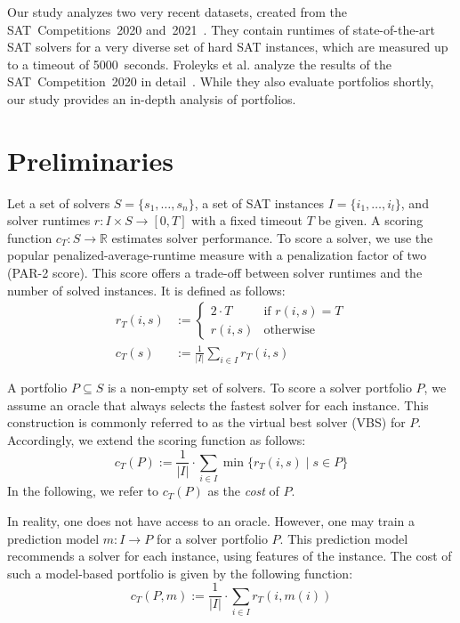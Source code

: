 \documentclass[a4paper,USenglish,pdfa]{lipics-v2021} %
\begin{document}
Our study analyzes two very recent datasets, created from the SAT~Competitions~2020 and~2021~\cite{balyo2020proceedings,balyo2021proceedings}. 
They contain runtimes of state-of-the-art SAT solvers for a very diverse set of hard SAT instances, which are measured up to a timeout of 5000~seconds.
Froleyks et al. analyze the results of the SAT~Competition~2020 in detail~\cite{SC2020:AIJ}.
While they also evaluate portfolios shortly, our study provides an in-depth analysis of portfolios.

\section{Preliminaries}
\label{sec:preliminaries}

Let a set of solvers $S = \{s_1, \dots, s_n\}$, a set of SAT instances $I = \{i_1, \dots, i_l\}$, and solver runtimes $r: I \times S \rightarrow [0, T]$ with a fixed timeout $T$ be given.
A scoring function $c_T: S \rightarrow \mathbb{R}$ estimates solver performance. 
To score a solver, we use the popular penalized-average-runtime measure with a penalization factor of two (PAR-2 score). 
This score offers a trade-off between solver runtimes and the number of solved instances.
It is defined as follows:%
\begin{align}
r_T(i,s) &:= \begin{cases}
	2 \cdot T & \text{if }r(i,s) = T\\
	r(i,s) & \text{otherwise}
\end{cases} \tag*{Penalized Runtimes}\\[.5em]
c_T(s) &:= \frac{1}{|I|} \sum_{i \in I}{r_T(i,s)} \tag*{PAR-2 Score}
\end{align}

A portfolio $P \subseteq S$ is a non-empty set of solvers.
To score a solver portfolio $P$, we assume an oracle that always selects the fastest solver for each instance. 
This construction is commonly referred to as the virtual best solver (VBS) for $P$. 
Accordingly, we extend the scoring function as follows:%
\[
	c_{T}(P) := \frac{1}{|I|} \cdot \sum\limits_{i \in I}{\min\{r_T(i,s) \mid s \in P\}}
\]
In the following, we refer to $c_{T}(P)$ as the \emph{cost} of $P$. 

In reality, one does not have access to an oracle.
However, one may train a prediction model $m: I \rightarrow P$ for a solver portfolio $P$.
This prediction model recommends a solver for each instance, using features of the instance. 
The cost of such a model-based portfolio is given by the following function:%
\[
	c_{T}(P,m) := \frac{1}{|I|} \cdot \sum\limits_{i \in I}{r_T(i,m(i))}
\]
\end{document}
